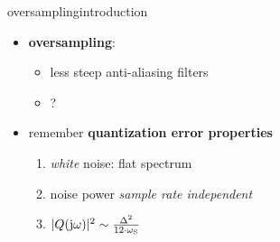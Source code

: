 	\begin{frame}{oversampling}{introduction}
		\begin{itemize}
            \item   \textbf{oversampling}: 
            \begin{itemize}
                \item<2->[$\Rightarrow$]	less steep anti-aliasing filters
                \item<2->[$\Rightarrow$]	?
            \end{itemize}

            \bigskip
			\item<3->	remember \textbf{quantization error properties}
			\begin{enumerate}
				\item	\textit{white} noise: flat spectrum
				\item	noise power \textit{sample rate independent}
                \bigskip
                \item<4->[$\Rightarrow$] $|Q(\mathrm{j}\omega)|^2 \sim \frac{\Delta^2}{12\cdot \omega_\mathrm{S}}$
			\end{enumerate}
		\end{itemize}
        
        \bigskip
	\end{frame}	
    
